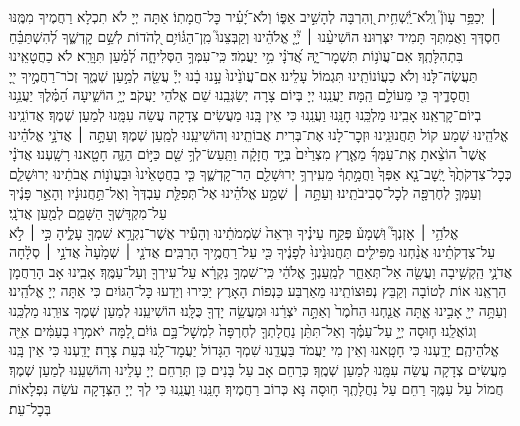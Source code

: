 \documentclass[twoside, openany, parskip=half, 11pt]{book}
\begin{document}
׀ יְכַפֵּ֥ר עָוֺן֮ וְֽלֹא־יַֽ֫שְׁחִ֥ית וְ֭הִרְבָּה לְהָשִׁ֣יב אַפּ֑וֹ וְלֹא־יָ֝עִ֗יר כׇּל־חֲמָתֽוֹ׃ אַתָּה יְיָ לֹא תִכְלָא רַחֲמֶיךָ מִמֶּֽנּוּ חַסְדְּךָ וַאֲמִתְּךָ תָּמִיד יִצְּרֽוּנוּ׃ הוֹשִׁיעֵ֨נוּ ׀ יְ֘יָ֤ אֱלֹהֵ֗ינוּ וְקַבְּצֵנוּ֮ מִֽן־הַגּ֫וֹיִ֥ם לְ֭הֹדוֹת לְשֵׁ֣ם קׇדְשֶׁ֑ךָ לְ֝הִשְׁתַּבֵּ֗חַ בִּתְהִלָּתֶֽךָ׃
אִם־עֲוֺנ֥וֹת תִּשְׁמׇר־יָ֑הּ אֲ֝דֹנָ֗י מִ֣י יַעֲמֹֽד׃ כִּֽי־עִמְּךָ֥ הַסְּלִיחָ֑ה לְ֝מַ֗עַן תִּוָּרֵֽא׃ לֹא כַחֲטָאֵֽינוּ תַּעֲשֶׂה־לָּנוּ וְלֹא כַעֲוֹנוֹתֵֽינוּ תִּגְמוֹל עָלֵינוּ׃
אִם־עֲוֺנֵ֙ינוּ֙ עָ֣נוּ בָ֔נוּ יְיָ֕ עֲשֵׂ֖ה לְמַ֣עַן שְׁמֶ֑ךָ זְכֹר־רַחֲמֶ֣יךָ ייָ֭ וַחֲסָדֶ֑יךָ כִּ֖י מֵעוֹלָ֣ם הֵֽמָּה׃ יַעֲנֵֽנוּ יְיָ בְּיוֹם צָרָה יְשַׂגְּבֵֽנוּ שֵׁם אֱלֹהֵי יַעֲקֹב׃
יְיָ֥  הוֹשִׁ֑יעָה הַ֝מֶּ֗לֶךְ יַעֲנֵ֥נוּ בְיוֹם־קׇרְאֵֽנוּ׃
אָבִֽינוּ מַלְכֵּֽנוּ חׇנֵּֽנוּ וַעֲנֵֽנוּ כִּי אֵין בָּֽנוּ מַעֲשִׂים צְדָקָה עֲשֵׂה עִמָּֽנוּ לְמַעַן שְׁמֶךָ׃
אֲדוֹנֵֽינוּ אֱלֹהֵֽינוּ שְׁמַע קוֹל תַּחֲנוּנֵֽינוּ וּזְכׇר־לָנוּ אֶת־בְּרִית אֲבוֹתֵֽינוּ וְהוֹשִׁיעֵֽנוּ לְמַֽעַן שְׁמֶךָ׃
וְעַתָּ֣ה ׀ אֲדֹנָ֣י אֱלֹהֵ֗ינוּ אֲשֶׁר֩ הוֹצֵ֨אתָ אֶֽת־עַמְּךָ֜ מֵאֶ֤רֶץ מִצְרַ֙יִם֙ בְּיָ֣ד חֲזָקָ֔ה וַתַּֽעַשׂ־לְךָ֥ שֵׁ֖ם כַּיּ֣וֹם הַזֶּ֑ה חָטָ֖אנוּ רָשָֽׁעְנוּ׃ אֲדֹנָ֗י כְּכׇל־צִדְקֹתֶ֙ךָ֙ יָֽשׇׁב־נָ֤א אַפְּךָ֙ וַחֲמָ֣תְךָ֔ מֵעִֽירְךָ֥ יְרוּשָׁלַ֖‍ִם הַר־קׇדְשֶׁ֑ךָ כִּ֤י בַחֲטָאֵ֙ינוּ֙ וּבַעֲוֺנ֣וֹת אֲבֹתֵ֔ינוּ יְרוּשָׁלַ֧‍ִם וְעַמְּךָ֛ לְחֶרְפָּ֖ה לְכׇל־סְבִיבֹתֵֽינוּ׃ וְעַתָּ֣ה ׀ שְׁמַ֣ע אֱלֹהֵ֗ינוּ אֶל־תְּפִלַּ֤ת עַבְדְּךָ֙ וְאֶל־תַּ֣חֲנוּנָ֔יו וְהָאֵ֣ר פָּנֶ֔יךָ עַל־מִקְדָּשְׁךָ֖ הַשָּׁמֵ֑ם לְמַ֖עַן אֲדֹנָֽי׃\\
אֱלֹהַ֥י ׀ אׇזְנְךָ֮ וּֽשְׁמָע֒ פְּקַ֣ח עֵינֶ֗יךָ וּרְאֵה֙ שֹֽׁמְמֹתֵ֔ינוּ וְהָעִ֕יר אֲשֶׁר־נִקְרָ֥א שִׁמְךָ֖ עָלֶ֑יהָ כִּ֣י ׀ לֹ֣א עַל־צִדְקֹתֵ֗ינוּ אֲנַ֨חְנוּ מַפִּילִ֤ים תַּחֲנוּנֵ֙ינוּ֙ לְפָנֶ֔יךָ כִּ֖י עַל־רַחֲמֶ֥יךָ הָרַבִּֽים׃ אֲדֹנָ֤י ׀ שְׁמָ֙עָה֙ אֲדֹנָ֣י ׀ סְלָ֔חָה אֲדֹנָ֛י הַֽקְשִׁ֥יבָה וַעֲשֵׂ֖ה אַל־תְּאַחַ֑ר לְמַֽעַנְךָ֣ אֱלֹהַ֔י כִּֽי־שִׁמְךָ֣ נִקְרָ֔א עַל־עִירְךָ֖ וְעַל־עַמֶּֽךָ׃ אָבִֽינוּ אָב הָרַחֲמָן הַרְאֵֽנוּ אוֹת לְטוֹבָה וְקַבֵּץ נְפוּצוֹתֵֽינוּ מֵאַרְבַּע כַּנְפוֹת הָאָרֶץ יַכִּירוּ וְיֵדְעוּ כׇּל־הַגּוֹיִם כִּי אַתָּה יְיָ אֱלֹהֵֽינוּ׃
וְעַתָּ֥ה ייָ֖ אָבִ֣ינוּ אָ֑תָּה אֲנַ֤חְנוּ הַחֹ֙מֶר֙ וְאַתָּ֣ה יֹצְרֵ֔נוּ וּמַעֲשֵׂ֥ה יָדְךָ֖ כֻּלָּֽנוּ׃ הוֹשִׁיעֵֽנוּ לְמַעַן שְׁמֶךָ צוּרֵֽנוּ מַלְכֵּֽנוּ וְגוֹאֲלֵֽנוּ׃
ח֧וּסָה יְיָ֣ עַל־עַמֶּ֗ךָ וְאַל־תִּתֵּ֨ן נַחֲלָתְךָ֤ לְחֶרְפָּה֙ לִמְשׇׁל־בָּ֣ם גּוֹיִ֔ם לָ֚מָּה יֹאמְר֣וּ בָעַמִּ֔ים אַיֵּ֖ה אֱלֹהֵיהֶֽם׃ יָדַֽעְנוּ כִּי חָטָֽאנוּ וְאֵין מִי יַעֲמֹד בַּעֲדֵֽנוּ שִׁמְךָ הַגָּדוֹל יַעֲמׇד־לָֽנוּ בְּעֵת צָרָה׃ יָדַֽעְנוּ כִּי אֵין בָּֽנוּ מַעֲשִׂים צְדָקָה עֲשֵׂה עִמָּֽנוּ לְמַעַן שְׁמֶֽךָ׃ כְּרַחֵם אָב עַל בָּנִים כֵּן תְּרַחֵם יְיָ עָלֵינוּ וְהוֹשִׁעֵֽנוּ לְמַעַן שְׁמֶךָ׃ חֲמוֹל עַל עַמֶּֽךָ רַחֵם עַל נַחֲלָתֶֽךָ חֽוּסָה נָּא כְּרוֹב רַחֲמֶיךָ׃ חׇנֵּֽנוּ וַעֲנֵֽנוּ כִּי לְךָ יְיָ הַצְּדָקָה עֹשֵׂה נִפְלָאוֹת בְּכׇל־עֵת׃\\
\end{document}
